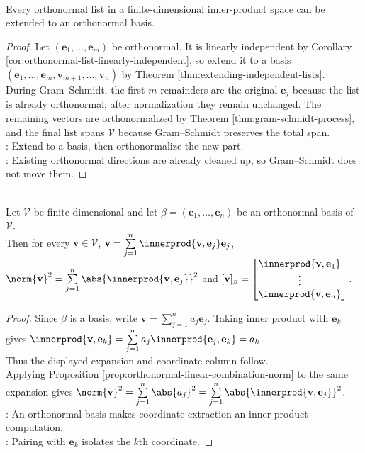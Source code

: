 \begin{corollary} \label{cor:orthonormal-list-extends-to-basis} \\
Every orthonormal list in a finite-dimensional inner-product space can be extended to an orthonormal basis.
\begin{proof}
Let $(\mathbf{e}_1,\ldots,\mathbf{e}_m)$ be orthonormal. It is linearly independent by Corollary \ref{cor:orthonormal-list-linearly-independent}, so extend it to a basis $(\mathbf{e}_1,\ldots,\mathbf{e}_m,\mathbf{v}_{m+1},\ldots,\mathbf{v}_n)$ by Theorem \ref{thm:extending-independent-lists}. \\
During Gram--Schmidt, the first $m$ remainders are the original $\mathbf{e}_j$ because the list is already orthonormal; after normalization they remain unchanged. The remaining vectors are orthonormalized by Theorem \ref{thm:gram-schmidt-process}, and the final list spans $\mathcal{V}$ because Gram--Schmidt preserves the total span.\\
: Extend to a basis, then orthonormalize the new part.\\
: Existing orthonormal directions are already cleaned up, so Gram--Schmidt does not move them.
\end{proof}
\end{corollary}

\begin{theorem} \label{thm:orthonormal-basis-coordinates} \\
Let $\mathcal{V}$ be finite-dimensional and let $\beta=(\mathbf{e}_1,\ldots,\mathbf{e}_n)$ be an orthonormal basis of $\mathcal{V}$.\\
Then for every $\mathbf{v}\in\mathcal{V}$, $\mathbf{v}=\sum\limits_{j=1}^{n}\innerprod{\mathbf{v},\mathbf{e}_j}\mathbf{e}_j$, $\norm{\mathbf{v}}^2=\sum\limits_{j=1}^{n}\abs{\innerprod{\mathbf{v},\mathbf{e}_j}}^2$ and $[\mathbf{v}]_{\beta}=
\begin{bmatrix}
\innerprod{\mathbf{v},\mathbf{e}_1}\\
\vdots\\
\innerprod{\mathbf{v},\mathbf{e}_n}
\end{bmatrix}$.
\begin{proof}
Since $\beta$ is a basis, write $\mathbf{v}=\sum\limits_{j=1}^{n}a_j\mathbf{e}_j$. Taking inner product with $\mathbf{e}_k$ gives $\innerprod{\mathbf{v},\mathbf{e}_k}=\sum\limits_{j=1}^{n}a_j\innerprod{\mathbf{e}_j,\mathbf{e}_k}=a_k$.\\
Thus the displayed expansion and coordinate column follow.\\
Applying Proposition \ref{prop:orthonormal-linear-combination-norm} to the same expansion gives $\norm{\mathbf{v}}^2=\sum\limits_{j=1}^{n}\abs{a_j}^2=\sum\limits_{j=1}^{n}\abs{\innerprod{\mathbf{v},\mathbf{e}_j}}^2$.\\
: An orthonormal basis makes coordinate extraction an inner-product computation.\\
: Pairing with $\mathbf{e}_k$ isolates the $k$th coordinate.
\end{proof}
\end{theorem}

